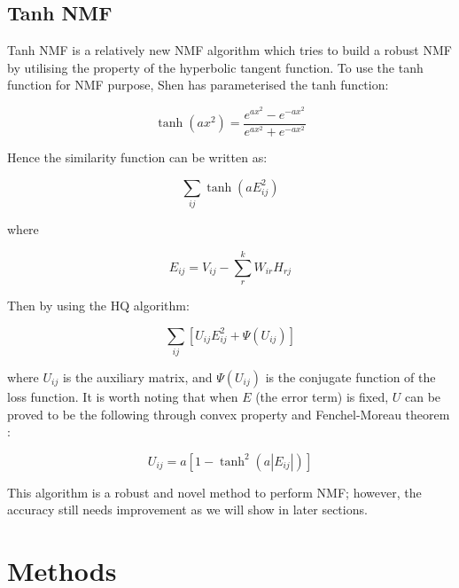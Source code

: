 \documentclass{article} %
\begin{document}
\subsection{Tanh NMF}
Tanh NMF is a relatively new NMF algorithm which tries to build a robust NMF by utilising the property of the hyperbolic tangent function. \cite{shen-zhang-lan-liao-luo} To use the tanh function for NMF purpose, Shen has parameterised the tanh function:

\begin{equation}
\tanh\left(ax^2\right) = \frac{e^{ax^2} - e^{-ax^2}}{e^{ax^2} + e^{-ax^2}}
\end{equation}

Hence the similarity function can be written as:

\begin{equation}
\sum_{ij}\tanh\left(aE_{ij}^2\right)
\end{equation}

where

\begin{equation}
E_{ij} = V_{ij} - \sum_r^k W_{ir}H_{rj}
\end{equation}

Then by using the HQ algorithm:

\begin{equation}
\sum_{ij}\left[U_{ij}E_{ij}^2 + \Psi\left(U_{ij}\right)\right]
\end{equation}

where $U_{ij}$ is the auxiliary matrix, and $\Psi\left(U_{ij}\right)$ is the conjugate function of the loss function. It is worth noting that when $E$ (the error term) is fixed, $U$ can be proved to be the following through convex property and Fenchel-Moreau theorem \cite{shen-zhang-lan-liao-luo}:

\begin{equation}
U_{ij} = a\left[1 - \tanh^2\left(a\left|E_{ij}\right|\right)\right]
\end{equation}

This algorithm is a robust and novel method to perform NMF; however, the accuracy still needs improvement as we will show in later sections.

\section{Methods}
\end{document}

